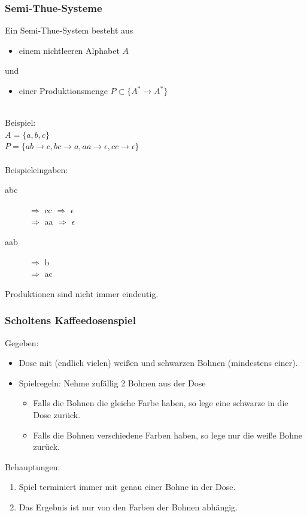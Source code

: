 \begin{frame}
\frametitle{Semi-Thue-Systeme}
Ein Semi-Thue-System besteht aus
\begin{itemize}
	\item einem nichtleeren Alphabet $A$
\end{itemize}
und
\begin{itemize}
	\item einer Produktionsmenge $P \subset \{A^* \rightarrow A^*\}$
\end{itemize}~\\
Beispiel:~\\
$A = \{a, b, c\}$~\\
$P = \{ab \rightarrow c, bc \rightarrow a, aa \rightarrow \epsilon, cc \rightarrow \epsilon\}$~\\~\\
Beispieleingaben:
\begin{description}
	\item[abc] $\Rightarrow$ cc $\Rightarrow$ $\epsilon$~\\
	$\Rightarrow$ aa $\Rightarrow$ $\epsilon$~\\
	\item[aab] $\Rightarrow$ b~\\
	$\Rightarrow$ ac
\end{description}
Produktionen sind nicht immer eindeutig.
\end{frame}
\begin{frame}
	\frametitle{Scholtens Kaffeedosenspiel}
	Gegeben: 
	\begin{itemize}
		\item Dose mit (endlich vielen) weißen und schwarzen Bohnen (mindestens einer).
		\item Spielregeln: Nehme zufällig 2 Bohnen aus der Dose
		\begin{itemize}
			\item Falls die Bohnen die gleiche Farbe haben, so lege eine schwarze in die Dose zurück.
			\item Falls die Bohnen verschiedene Farben haben, so lege nur die weiße Bohne zurück.
		\end{itemize}
	\end{itemize}
	Behauptungen:
	\begin{enumerate}
		\item Spiel terminiert immer mit genau einer Bohne in der Dose.
		\item Das Ergebnis ist nur von den Farben der Bohnen abhängig.
	\end{enumerate}
\end{frame}
